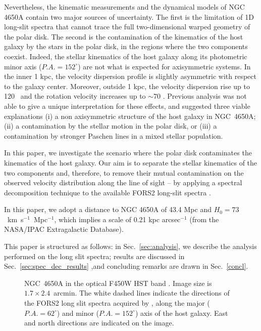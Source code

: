 \documentclass{aa}
\begin{document}
 Nevertheless, the kinematic measurements and the dynamical models
  of NGC 4650A contain two major sources of uncertainty. The first is
  the limitation of 1D long-slit spectra that cannot trace the full
two-dimensional warped geometry of the polar disk. The second is
the contamination of the kinematics of the host galaxy by the stars in
the polar disk, in the regions where the two components coexist. 
%
Indeed, the stellar kinematics of the host galaxy along its
photometric minor axis ($P.A. = 152^{\circ}$) are not what is expected
for axisymmetric systems. In the inner 1 kpc, the velocity dispersion
profile is slightly asymmetric with respect to the galaxy
center. Moreover, outside 1 kpc, the velocity dispersion rise up to
120 \kms\, and the rotation velocity increases up to $\sim 70$ \kms.
Previous analysis was not able to give a unique interpretation for
these effects, and suggested three viable explanations
\citep{Iodice+06} (i) a non axisymmetric structure of the host galaxy
in NGC~4650A; (ii) a contamination by the stellar motion in the polar
disk, or (iii) a contamination by stronger Paschen lines in a mixed stellar
population.

In this paper, we investigate the scenario where the polar disk
  contaminates the kinematics of the host galaxy. Our aim is to
separate the stellar kinematics of the two components and, therefore,
to remove their mutual contamination on the observed velocity
distribution along the line of sight -- by applying a spectral
decomposition technique to the available FORS2 long-slit spectra
\citep{Iodice+06}.


In this paper, we adopt a distance to NGC 4650A of 43.4 Mpc and
$H_0=73$~km~s$^{-1}$~Mpc$^{-1}$, which implies a scale of 0.21 kpc
arcsec$^{-1}$ (from the NASA/IPAC Extragalactic Database).


This paper is structured as follows: in Sec.~\ref{sec:analysis}, we
describe the analysis performed on the long slit spectra; results are
discussed in Sec.~\ref{sec:spec_dec_results} ,and concluding remarks
are drawn in Sec.~\ref{concl}.


\begin{figure}
  \caption{NGC~4650A in the optical F450W HST band
    \citep{Iodice+02}. Image size is $1.7 \times 2.4$~arcmin. The
    white dashed lines indicate the directions of the FORS2 long slit
    spectra acquired by \citet{Iodice+06}, along the major ($P.A. =
    62^{\circ}$) and minor ($P.A. = 152^{\circ}$) axis of the host
    galaxy. East and north directions are indicated on the image.}
\label{4650a}
\end{figure}
\end{document}
